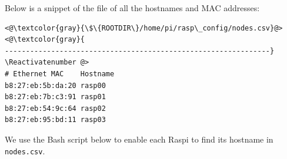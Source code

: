 %


Below is a snippet of the file of all the hostnames and \ac{MAC} addresses:



\Suppressnumber\begin{lstlisting}[]
<@\textcolor{gray}{\$\{ROOTDIR\}/home/pi/rasp\_config/nodes.csv}@>
<@\textcolor{gray}{
---------------------------------------------------------------}
\Reactivatenumber @>
# Ethernet MAC    Hostname
b8:27:eb:5b:da:20 rasp00
b8:27:eb:7b:c3:91 rasp01
b8:27:eb:54:9c:64 rasp02
b8:27:eb:95:bd:11 rasp03
\end{lstlisting}
\FloatBarrier
\vspace{-5mm}

We use the \ac{Bash} script below to enable each \ac{Raspi} to find its
hostname in \texttt{nodes.csv}.

